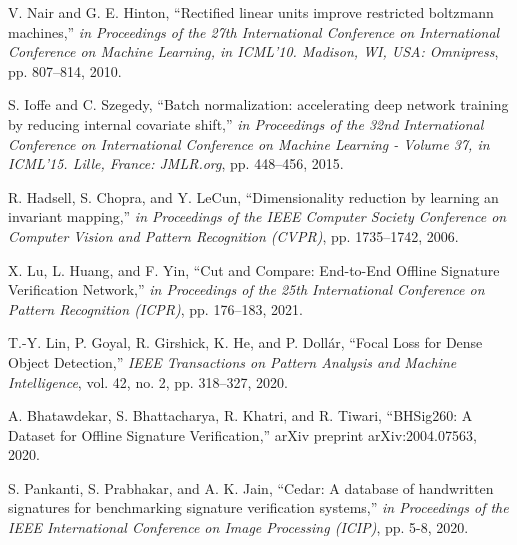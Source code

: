 \documentclass{article}
\begin{document}
\begin{thebibliography}{10}
	V. Nair and G. E. Hinton,
	``Rectified linear units improve restricted boltzmann machines,''
	\emph{in Proceedings of the 27th International Conference on International Conference on Machine Learning, in ICML’10. Madison, WI, USA: Omnipress},
	pp. 807--814, 2010.

	S. Ioffe and C. Szegedy,
	``Batch normalization: accelerating deep network training by reducing internal covariate shift,''
	\emph{in Proceedings of the 32nd International Conference on International Conference on Machine Learning - Volume 37, in ICML'15. Lille, France: JMLR.org},
	pp. 448--456, 2015.

	R. Hadsell, S. Chopra, and Y. LeCun,
	``Dimensionality reduction by learning an invariant mapping,''
	\emph{in Proceedings of the IEEE Computer Society Conference on Computer Vision and Pattern Recognition (CVPR)},
	pp. 1735--1742, 2006.

	X. Lu, L. Huang, and F. Yin,
	``Cut and Compare: End-to-End Offline Signature Verification Network,''
	\emph{in Proceedings of the 25th International Conference on Pattern Recognition (ICPR)},
	pp. 176--183, 2021.

	T.-Y. Lin, P. Goyal, R. Girshick, K. He, and P. Dollár,
	``Focal Loss for Dense Object Detection,''
	\emph{IEEE Transactions on Pattern Analysis and Machine Intelligence},
	vol. 42, no. 2, pp. 318--327, 2020.

	A. Bhatawdekar, S. Bhattacharya, R. Khatri, and R. Tiwari,
	``BHSig260: A Dataset for Offline Signature Verification,''
	arXiv preprint arXiv:2004.07563, 2020.

	S. Pankanti, S. Prabhakar, and A. K. Jain,
	``Cedar: A database of handwritten signatures for benchmarking signature verification systems,''
	\emph{in Proceedings of the IEEE International Conference on Image Processing (ICIP)},
	pp. 5-8, 2020.

\end{thebibliography}
\end{document}
